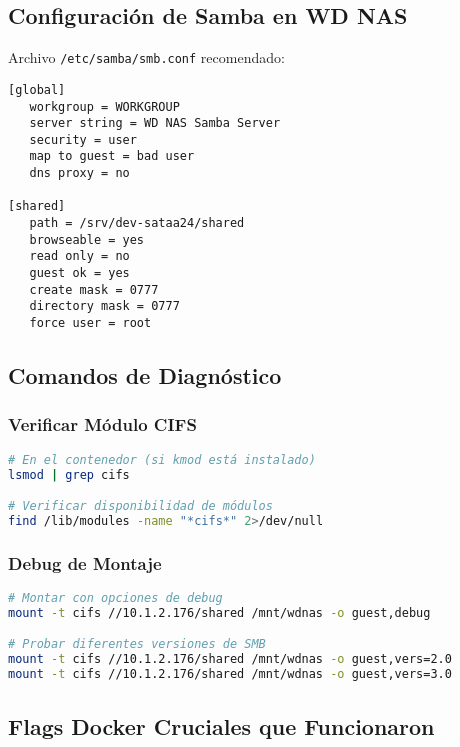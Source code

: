 \documentclass[12pt, a4paper]{article}
\begin{document}
\subsection{Configuración de Samba en WD NAS}
\label{subsec:configuracion_samba}

Archivo \texttt{/etc/samba/smb.conf} recomendado:
\begin{lstlisting}[caption=Configuración Samba recomendada]
[global]
   workgroup = WORKGROUP
   server string = WD NAS Samba Server
   security = user
   map to guest = bad user
   dns proxy = no

[shared]
   path = /srv/dev-sataa24/shared
   browseable = yes
   read only = no
   guest ok = yes
   create mask = 0777
   directory mask = 0777
   force user = root
\end{lstlisting}

\subsection{Comandos de Diagnóstico}
\label{subsec:diagnostico}

\subsubsection{Verificar Módulo CIFS}
\begin{lstlisting}[language=bash, caption=Verificación de módulos CIFS]
# En el contenedor (si kmod está instalado)
lsmod | grep cifs

# Verificar disponibilidad de módulos
find /lib/modules -name "*cifs*" 2>/dev/null
\end{lstlisting}

\subsubsection{Debug de Montaje}
\begin{lstlisting}[language=bash, caption=Debug del proceso de montaje]
# Montar con opciones de debug
mount -t cifs //10.1.2.176/shared /mnt/wdnas -o guest,debug

# Probar diferentes versiones de SMB
mount -t cifs //10.1.2.176/shared /mnt/wdnas -o guest,vers=2.0
mount -t cifs //10.1.2.176/shared /mnt/wdnas -o guest,vers=3.0
\end{lstlisting}

\subsection{Flags Docker Cruciales que Funcionaron}
\label{subsec:flags_docker}
\end{document}
